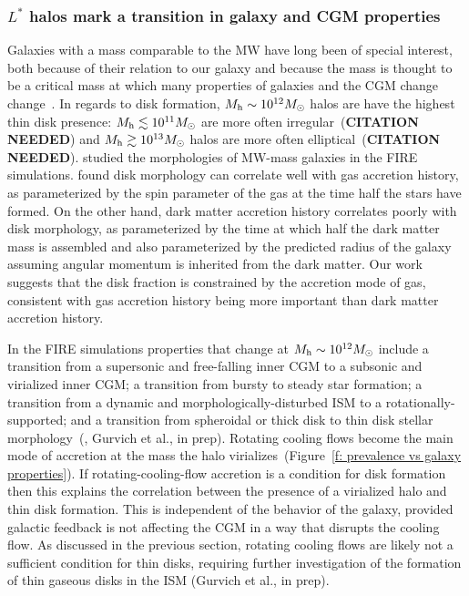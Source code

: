 \documentclass[fleqn,usenatbib]{mnras}
\begin{document}
\subsubsection{$L^*$ halos mark a transition in galaxy and CGM properties}
\label{s: disk formation -- transition}

Galaxies with a mass comparable to the MW have long been of special interest, both because of their relation to our galaxy and because the mass is thought to be a critical mass at which many properties of galaxies and the CGM change change~\citep[e.g.][]{Fielding2017, Correa2017, Dekel2019a}.
In regards to disk formation, $M_{\rm h} \sim 10^{12} M_\odot$ halos are have the highest thin disk presence:
$M_{\rm h} \lesssim 10^{11} M_\odot$ are more often irregular~(\textbf{CITATION NEEDED}) and $M_{\rm h} \gtrsim 10^{13} M_\odot$ halos are more often elliptical~(\textbf{CITATION NEEDED}).
\cite{Garrison-Kimmel2018} studied the morphologies of MW-mass galaxies in the FIRE simulations.
\citeauthor{Garrison-Kimmel2018} found disk morphology can correlate well with gas accretion history, as parameterized by the spin parameter of the gas at the time half the stars have formed.
On the other hand, dark matter accretion history correlates poorly with disk morphology, as parameterized by the time at which half the dark matter mass is assembled and also parameterized by the predicted radius of the galaxy assuming angular momentum is inherited from the dark matter.
Our work suggests that the disk fraction is constrained by the accretion mode of gas, consistent with gas accretion history being more important than dark matter accretion history.

In the FIRE simulations properties that change at $M_{\rm h}\sim10^{12} M_\odot$ include a transition from a supersonic and free-falling inner CGM to a subsonic and virialized inner CGM;
a transition from bursty to steady star formation;
a transition from a dynamic and morphologically-disturbed ISM to a rotationally-supported;
and a transition from spheroidal or thick disk to thin disk stellar morphology~(\citealt{El-Badry2018a, Stern2020, Yu2021}, Gurvich et al., in prep).
Rotating cooling flows become the main mode of accretion at the mass the halo virializes~(Figure~\ref{f: prevalence vs galaxy properties}).
If rotating-cooling-flow accretion is a condition for disk formation then this explains the correlation between the presence of a virialized halo and thin disk formation.
This is independent of the behavior of the galaxy, provided galactic feedback is not affecting the CGM in a way that disrupts the cooling flow.
As discussed in the previous section, rotating cooling flows are likely not a sufficient condition for thin disks, requiring further investigation of the formation of thin gaseous disks in the ISM (Gurvich et al., in prep).
\end{document}
